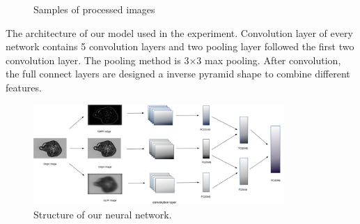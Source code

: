 \documentclass[conference]{IEEEtran}
\begin{document}
\begin{figure}[!ht]
\centering
{}
  \hspace{0.15in}
  \hspace{0.15in}
  \hspace{0.15in}
  \caption{Samples of processed images}
\end{figure}


The architecture of our model used in the experiment. Convolution layer of every network contains 5 convolution layers and two pooling layer followed the first two convolution layer. The pooling method is 3\begin{math} \times \end{math}3 max pooling. After convolution, the full connect layers are designed a inverse pyramid shape to combine different features. 



\begin{figure}[!ht]
\centering
\includegraphics[width=0.85\textwidth]{network}
\caption{Structure of our neural network.}
\label{fig:network}
\end{figure}
\end{document}
